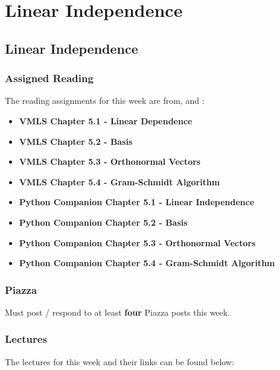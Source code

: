 \clearpage

\renewcommand{\ChapTitle}{Linear Independence}
\renewcommand{\SectionTitle}{Linear Independence}

\chapter{\ChapTitle}
\section{\SectionTitle}

\subsection{Assigned Reading}

The reading assignments for this week are from, \VMLS \hspace*{1pt} and \PyCap:

\begin{itemize}
    \item \textbf{VMLS Chapter 5.1 - Linear Dependence}
    \item \textbf{VMLS Chapter 5.2 - Basis}
    \item \textbf{VMLS Chapter 5.3 - Orthonormal Vectors}
    \item \textbf{VMLS Chapter 5.4 - Gram-Schmidt Algorithm}
    \item \textbf{Python Companion Chapter 5.1 - Linear Independence}
    \item \textbf{Python Companion Chapter 5.2 - Basis}
    \item \textbf{Python Companion Chapter 5.3 - Orthonormal Vectors}
    \item \textbf{Python Companion Chapter 5.4 - Gram-Schmidt Algorithm}
\end{itemize}

\subsection{Piazza}

Must post / respond to at least \textbf{four} Piazza posts this week.

\subsection{Lectures}

The lectures for this week and their links can be found below:

